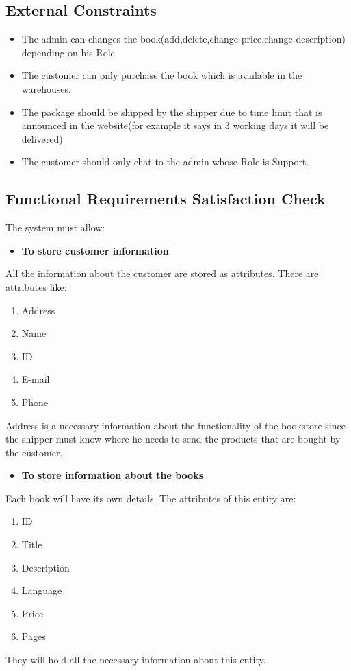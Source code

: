 \subsection{External Constraints}
\begin{itemize}
        
        \item The admin can changes the book(add,delete,change price,change description) depending on his Role
        \item The customer can only purchase the book which is available in the warehouses.
        \item The package should be shipped by the shipper due to time limit that is announced in the website(for example it says in 3 working days it will be delivered)
        \item The customer should only chat to the admin whose Role is Support.
    \end{itemize}
    
\subsection{Functional Requirements Satisfaction Check}
The system must allow:
\begin{itemize}
\item \textbf{To store customer information}
\end{itemize}
All the information about the customer are stored as attributes. There are attributes like:
\begin{enumerate}
\item Address
\item Name
\item ID
\item E-mail
\item Phone
\end{enumerate} 
Address is a necessary information about the functionality of the bookstore since the shipper must know where he needs to send the products that are bought by the customer. 

\begin{itemize}
\item \textbf{To store information about the books}
\end{itemize}
Each book will have its own details. The attributes of this entity are: 
\begin{enumerate}
\item ID
\item Title
\item Description
\item Language
\item Price
\item Pages
\end{enumerate}
They will hold all the necessary information about this entity. 

